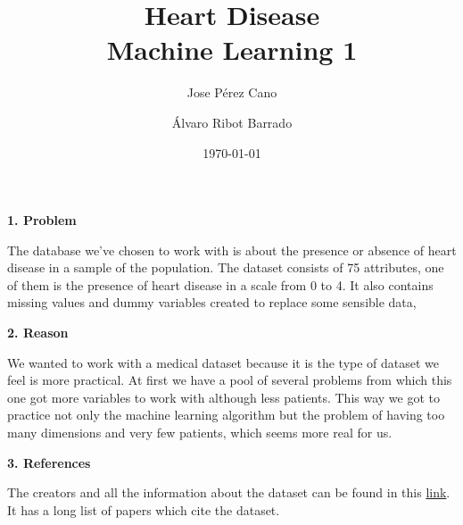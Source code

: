 \documentclass[a4paper]{article}
\title{Heart Disease\\ \Large Machine Learning 1}
\author{Jose Pérez Cano}
\author{Álvaro Ribot Barrado}
\affil{GCED -- FIB -- UPC}
\date{\today}
\begin{document}
\maketitle
\doublespacing
\newtheorem{prob}{Problem}

{\large {\textbf {1. Problem}}}

The database we've chosen to work with is about the presence or absence of heart disease in a sample of the population. The dataset consists of 75 attributes, one of them is the presence of heart disease in a scale from 0 to 4. It also contains missing values and dummy variables created to replace some sensible data,

{\large {\textbf {2. Reason}}}

We wanted to work with a medical dataset because it is the type of dataset we feel is more practical. At first we have a pool of several problems from which this one got more variables to work with although less patients. This way we got to practice not only the machine learning algorithm but the problem of having too many dimensions and very few patients, which seems more real for us. 

{\large {\textbf {3. References}}}

The creators and all the information about the dataset can be found in this \href{http://archive.ics.uci.edu/ml/datasets/Heart+Disease}{link}. It has a long list of papers which cite the dataset.
\end{document}
